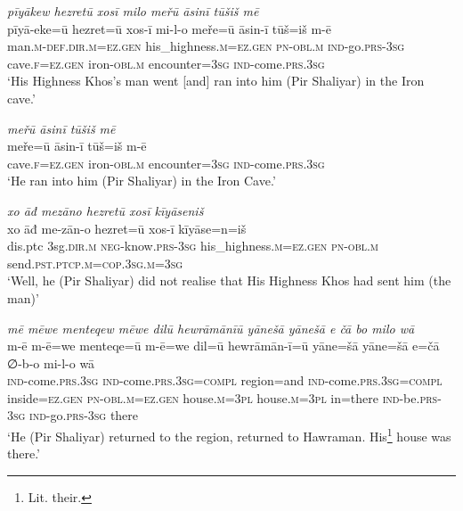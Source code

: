 \ea \label{ŽP.132}
\textit{pīyākew hezretū xosī milo meřū āsinī tūšiš mē} \\ 
\gll pīyā-eke=ū hezret=ū xos-ī mi-l-o meře=ū āsin-ī tūš=iš m-ē \\ 
 man\textsc{.m}\textsc{-def}\textsc{.dir}\textsc{.m}\textsc{\textsc{=ez.gen}} his\_highness\textsc{.m}\textsc{\textsc{=ez.gen}} \textsc{pn}\textsc{-obl}\textsc{.m} \textsc{ind-}go\textsc{.prs}\textsc{-3sg} cave\textsc{.f}\textsc{\textsc{=ez.gen}} iron\textsc{-obl}\textsc{.m} encounter\textsc{=3sg} \textsc{ind-}come\textsc{.prs}\textsc{.3sg} \\ 
\glt `His Highness Khos’s man went [and] ran into him (Pir Shaliyar) in the Iron cave.'
\z 
 
\ea \label{ŽP.133}
\textit{meřū āsinī tūšiš mē} \\ 
\gll meře=ū āsin-ī tūš=iš m-ē \\ 
 cave\textsc{.f}\textsc{\textsc{=ez.gen}} iron\textsc{-obl}\textsc{.m} encounter\textsc{=3sg} \textsc{ind-}come\textsc{.prs}\textsc{.3sg} \\ 
\glt `He ran into him (Pir Shaliyar) in the Iron Cave.'
\z 
 
\ea \label{ŽP.134}
\textit{xo āđ mezāno hezretū xosī kīyāseniš} \\ 
\gll xo āđ me-zān-o hezret=ū xos-ī kīyāse=n=iš \\ 
 dis.ptc 3sg\textsc{.dir}\textsc{.m} \textsc{neg-}know\textsc{.prs}\textsc{-3sg} his\_highness\textsc{.m}\textsc{\textsc{=ez.gen}} \textsc{pn}\textsc{-obl}\textsc{.m} send\textsc{.pst}\textsc{.ptcp}\textsc{.m}\textsc{=cop}\textsc{.3sg}\textsc{.m}\textsc{=3sg} \\ 
\glt `Well, he (Pir Shaliyar) did not realise that His Highness Khos had sent him (the man)'
\z 
 
\ea \label{ŽP.141}
\textit{mē mēwe menteqew mēwe dilū hewrāmānīū yānešā yānešā e čā bo milo wā} \\ 
\gll m-ē m-ē=we menteqe=ū m-ē=we dil=ū hewrāmān-ī=ū yāne=šā yāne=šā e=čā ∅-b-o mi-l-o wā \\ 
 \textsc{ind-}come\textsc{.prs}\textsc{.3sg} \textsc{ind-}come\textsc{.prs}\textsc{.3sg}\textsc{=compl} region=and \textsc{ind-}come\textsc{.prs}\textsc{.3sg}\textsc{=compl} inside\textsc{\textsc{=ez.gen}} \textsc{pn}\textsc{-obl}\textsc{.m}\textsc{\textsc{=ez.gen}} house\textsc{.m}\textsc{=3pl} house\textsc{.m}\textsc{=3pl} in=there \textsc{ind-}be\textsc{.prs}\textsc{-3sg} \textsc{ind-}go\textsc{.prs}\textsc{-3sg} there \\ 
\glt `He (Pir Shaliyar) returned to the region, returned to Hawraman. His\footnote{Lit. their.} house was there.'
\z 
 
